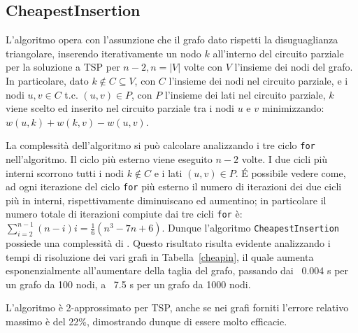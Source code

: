 \subsection{CheapestInsertion}

L'algoritmo opera con l'assunzione che il grafo dato rispetti la disuguaglianza triangolare, inserendo iterativamente un nodo $k$ all'interno del circuito parziale per la soluzione a TSP per $n-2, n=|V|$ volte con $V$ l'insieme dei nodi del grafo. In particolare, dato $k \notin C \subseteq V$, con $C$ l'insieme dei nodi nel circuito parziale, e i nodi $u,v \in C$ \mbox{t.c.} $(u,v)\in P$, con $P$ l'insieme dei lati nel circuito parziale, $k$ viene scelto ed inserito nel circuito parziale tra i nodi $u$ e $v$ minimizzando: $w(u,k)+w(k,v)-w(u,v)$.

La complessità dell'algoritmo si può calcolare analizzando i tre ciclo \texttt{for} nell'algoritmo. Il ciclo più esterno viene eseguito $n-2$ volte. I due cicli più interni scorrono tutti i nodi $k \notin C$ e i lati $(u,v)\in P$. \'E possibile vedere come, ad ogni iterazione del ciclo \texttt{for} più esterno il numero di iterazioni dei due cicli più in interni, rispettivamente diminuiscano ed aumentino; in particolare il numero totale di iterazioni compiute dai tre cicli \texttt{for} è: $\sum_{i=2}^{n-1} (n-i)i=\frac{1}{6}(n^3-7n+6)$. Dunque l'algoritmo \texttt{CheapestInsertion} possiede una complessità di .
Questo risultato risulta evidente analizzando i tempi di risoluzione dei vari grafi in Tabella~\ref{cheapin}, il quale aumenta esponenzialmente all'aumentare della taglia del grafo, passando dai ~0.004 s per un grafo da 100 nodi, a ~7.5 s per un grafo da 1000 nodi.

L'algoritmo è 2-approssimato per TSP, anche se nei grafi forniti l'errore relativo massimo è del 22\%, dimostrando dunque di essere molto efficacie.

